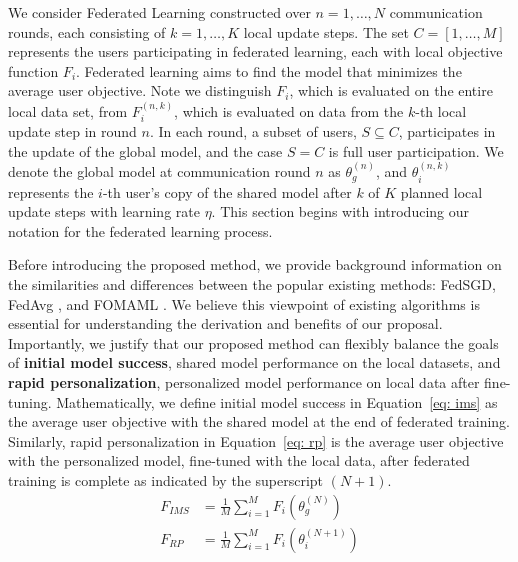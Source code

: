 We consider Federated Learning constructed over $n = 1, \ldots, N$ communication rounds, each consisting of $k = 1, \ldots, K$ local update steps.
The set $C = \left[1, \ldots, M \right]$ represents the users participating in federated learning, each with local objective function $F_i$. Federated learning aims to find the model that minimizes the average user objective.
Note we distinguish $F_i$, which is evaluated on the entire local data set, from $F_i^{(n, k)}$, which is evaluated on data from the $k$-th local update step in round $n$.
In each round, a subset of users, $S \subseteq C$, participates in the update of the global model, and the case $S = C$ is full user participation.
We denote the global model at communication round $n$ as $\theta_g^{(n)}$, and $\theta_i^{(n, k)}$ represents the $i$-th user's copy of the shared model after $k$ of $K$ planned local update steps with learning rate $\eta$.
This section begins with introducing our notation for the federated learning process.

Before introducing the proposed method, we provide background information on the similarities and differences between the popular existing methods: FedSGD, FedAvg \citep{fedavg}, and FOMAML \citep{reptile}. 
We believe this viewpoint of existing algorithms is essential for understanding the derivation and benefits of our proposal.
Importantly, we justify that our proposed method can flexibly balance the goals of \textbf{initial model success}, shared model performance on the local datasets, and \textbf{rapid personalization}, personalized model performance on local data after fine-tuning.
Mathematically, we define initial model success in Equation~\ref{eq: ims} as the average user objective with the shared model at the end of federated training. 
Similarly, rapid personalization in Equation~\ref{eq: rp} is the average user objective with the personalized model, fine-tuned with the local data, after federated training is complete as indicated by the superscript $(N + 1)$. 
\begin{align}
        F_{IMS} &= \frac{1}{M} \sum_{i = 1}^M F_i (\theta_g^{(N)}) \label{eq: ims} \\
    F_{RP} &= \frac{1}{M} \sum_{i = 1}^M F_i(\theta_i^{(N + 1)}) \label{eq: rp}
\end{align}

